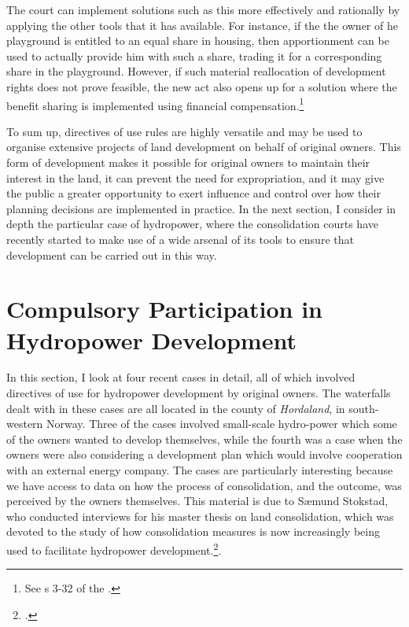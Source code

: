 {The court can implement solutions such as this more effectively and rationally by applying the other tools that it has available. For instance, if the the owner of he playground is entitled to an equal share in housing, then apportionment can be used to actually provide him with such a share, trading it for a corresponding share in the playground. However, if such material reallocation of development rights does not prove feasible, the new act also opens up for a solution where the benefit sharing is implemented using financial compensation.\footnote{See s 3-32 of the \cite{lca13}.}
}

To sum up, directives of use rules are highly versatile and may be used to organise extensive projects of land development on behalf of original owners. This form of development makes it possible for original owners to maintain their interest in the land, it can prevent the need for expropriation, and it may give the public a greater opportunity to exert influence and control over how their planning decisions are implemented in practice. In the next section, I consider in depth the particular case of hydropower, where the consolidation courts have recently started to make use of a wide arsenal of its tools to ensure that development can be carried out in this way.

\section{Compulsory Participation in Hydropower Development}\label{sec:lch}

In this section, I look at four recent cases in detail, all of which involved directives of use for hydropower development by original owners. The waterfalls dealt with in these cases are all located in the county of \emph{Hordaland}, in south-western Norway. Three of the cases involved small-scale hydro-power which some of the owners wanted to develop themselves, while the fourth was a case when the owners were also considering a development plan which would involve cooperation with an external energy company. The cases are particularly interesting because we have access to data on how the process of consolidation, and the outcome, was perceived by the owners themselves. This material is due to Sæmund Stokstad, who conducted interviews for his master thesis on land consolidation, which was devoted to the study of how consolidation measures is now increasingly being used to facilitate hydropower development.\footcite{stokstad11}.

